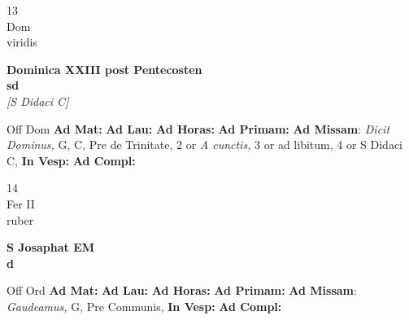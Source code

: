 \documentclass[10pt, openany]{book}
\begin{document}
    \begin{center}
        \begin{minipage}{3.5in}
            \vspace{2em}
            \begin{minipage}{0.5in}
                {\Huge 13} \\
                {\normalsize Dom} \\
                {\normalsize viridis}
            \end{minipage}
            \begin{minipage}{3.0in}
                \textbf{ \large Dominica XXIII post Pentecosten \\
                \textnormal{\normalsize sd}} \\ \textit{[S Didaci C]} \\ 
            \end{minipage}
            \begin{justify}Off Dom
                \textbf{Ad Mat: }
                \textbf{Ad Lau: }
                \textbf{Ad Horas: }
                \textbf{Ad Primam: }\textbf{Ad Missam}: \textit{Dicit Dominus,} G, C, Pre de Trinitate, 2 or \textit{A cunctis,} 3 or ad libitum, 4 or S Didaci C,  
                \textbf{In Vesp: }
                \textbf{Ad Compl: }
            \end{justify}
        \end{minipage}
    \end{center}

    \begin{center}
        \begin{minipage}{3.5in}
            \vspace{2em}
            \begin{minipage}{0.5in}
                {\Huge 14} \\
                {\normalsize Fer II} \\
                {\normalsize ruber}
            \end{minipage}
            \begin{minipage}{3.0in}
                \textbf{ \large S Josaphat EM \\
                \textnormal{\normalsize d}} \\ 
            \end{minipage}
            \begin{justify}Off Ord
                \textbf{Ad Mat: }
                \textbf{Ad Lau: }
                \textbf{Ad Horas: }
                \textbf{Ad Primam: }\textbf{Ad Missam}: \textit{Gaudeamus,} G, Pre Communis,  
                \textbf{In Vesp: }
                \textbf{Ad Compl: }
            \end{justify}
        \end{minipage}
    \end{center}
\end{document}
